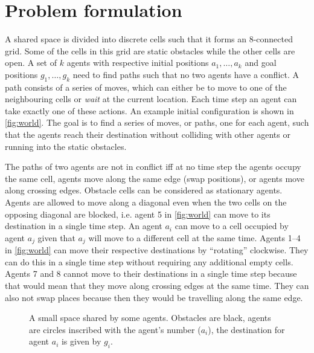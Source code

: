 \section{Problem formulation}\label{sec:problem}
A shared space is divided into discrete cells such that it forms an 8-connected
grid. Some of the cells in this grid are static obstacles while the other cells
are open. A set of $k$ agents with respective initial positions $a_1, \ldots,
a_k$ and goal positions $g_1, \ldots, g_k$ need to find paths such that no two
agents have a conflict. A path consists of a series of moves, which can either
be to move to one of the neighbouring cells or \emph{wait} at the current
location. Each time step an agent can take exactly one of these actions.
An example initial configuration is shown in \autoref{fig:world}. The goal is
to find a series of moves, or paths, one for each agent, such that the agents
reach their destination without colliding with other agents or running into the
static obstacles.

The paths of two agents are not in conflict iff at no time step the agents
occupy the same cell, agents move along the same edge (swap positions), or
agents move along
crossing edges. Obstacle cells can be considered as stationary agents. Agents
are allowed to move along a diagonal even when the two cells on the opposing
diagonal are blocked, i.e. agent 5 in \autoref{fig:world} can move to its
destination in a single time step. An agent $a_i$ can move to a cell occupied by
agent $a_j$ given that $a_j$ will move to a different cell at the same time.
Agents 1--4 in \autoref{fig:world} can move their respective destinations
by ``rotating'' clockwise. They can do this in a single time step without
requiring any additional empty cells. Agents 7 and 8 cannot move to their
destinations in a single time step because that would mean that they move along
crossing edges at the same time. They can also not swap places because then
they would be travelling along the same edge.

\begin{figure}[t]
    \centering
    \def\svgscale{.7}
    
    \caption{A small space shared by some agents. Obstacles are black, agents
        are circles inscribed with the agent's number ($a_i$), the destination
        for
        agent $a_i$ is given by $g_i$.}
    \label{fig:world}
\end{figure}
